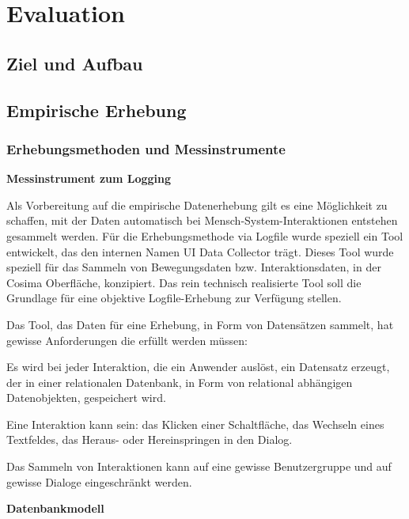 \section{Evaluation}

\subsection{Ziel und Aufbau}

\subsection{Empirische Erhebung}

\subsubsection{Erhebungsmethoden und Messinstrumente}



\textbf{Messinstrument zum Logging}

Als Vorbereitung auf die empirische Datenerhebung gilt es eine Möglichkeit zu schaffen, mit der Daten automatisch bei Mensch-System-Interaktionen entstehen gesammelt werden. Für die Erhebungsmethode via Logfile wurde speziell ein Tool entwickelt, das den internen Namen UI Data Collector trägt. Dieses Tool wurde speziell für das Sammeln von Bewegungsdaten bzw. Interaktionsdaten, in der Cosima Oberfläche, konzipiert. Das rein technisch realisierte Tool soll die Grundlage für eine objektive Logfile-Erhebung zur Verfügung stellen.

Das Tool, das Daten für eine Erhebung, in Form von Datensätzen sammelt, hat gewisse Anforderungen die erfüllt werden müssen:
\begin{compactitem}
   \item Es wird bei jeder Interaktion, die ein Anwender auslöst, ein Datensatz erzeugt, der in einer relationalen Datenbank, in Form von relational abhängigen Datenobjekten, gespeichert wird.
   \item Eine Interaktion kann sein: das Klicken einer Schaltfläche, das Wechseln eines Textfeldes, das Heraus- oder Hereinspringen in den Dialog.
   \item Das Sammeln von Interaktionen kann auf eine gewisse Benutzergruppe und auf gewisse Dialoge eingeschränkt werden.
\end{compactitem}

\textbf{Datenbankmodell}

